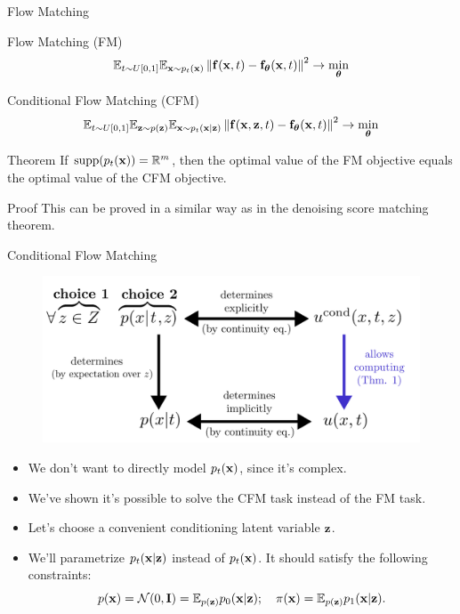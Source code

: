 \documentclass{beamer}
\begin{document}
\begin{frame}{Flow Matching}
	\begin{block}{Flow Matching (FM)}
		\vspace{-0.3cm}
		\[
			\mathbb{E}_{t \sim U[0, 1]} \mathbb{E}_{\mathbf{x} \sim p_t(\mathbf{x})}\left\| \mathbf{f}(\mathbf{x}, t) - \mathbf{f}_{\boldsymbol{\theta}}(\mathbf{x}, t) \right\|^2 \rightarrow \min_{\boldsymbol{\theta}}
		\]
		\vspace{-0.3cm}
	\end{block}
	\begin{block}{Conditional Flow Matching (CFM)}
		\vspace{-0.3cm}
		\[
			\mathbb{E}_{t \sim U[0, 1]} \mathbb{E}_{\mathbf{z} \sim p(\mathbf{z})} \mathbb{E}_{\mathbf{x} \sim p_t(\mathbf{x} | \mathbf{z})}\left\| \mathbf{f}(\mathbf{x}, \mathbf{z}, t) - \mathbf{f}_{\boldsymbol{\theta}}(\mathbf{x}, t) \right\|^2 \rightarrow \min_{\boldsymbol{\theta}}
		\]
		\vspace{-0.3cm}
	\end{block}
	\begin{block}{Theorem}
		If $\text{supp}(p_t(\mathbf{x})) = \mathbb{R}^m$, then the optimal value of the FM objective equals the optimal value of the CFM objective.
	\end{block}
	\begin{block}{Proof}
		This can be proved in a similar way as in the denoising score matching theorem.
	\end{block}
\end{frame}
\begin{frame}{Conditional Flow Matching}
	\begin{figure}
		\centering
		\includegraphics[width=0.75\linewidth]{figs/cfm_uncond_to_cond}
	\end{figure}
	\begin{itemize}
		\item We don't want to directly model $p_t(\mathbf{x})$, since it's complex.
		\item We've shown it's possible to solve the CFM task instead of the FM task.
		\item Let's choose a convenient conditioning latent variable $\mathbf{z}$.
		\item We'll parametrize $p_t(\mathbf{x} | \mathbf{z})$ instead of $p_t(\mathbf{x})$. It should satisfy the following constraints:
		\[
			p(\mathbf{x}) = \mathcal{N}(0, \mathbf{I}) = \mathbb{E}_{p(\mathbf{z})} p_0(\mathbf{x} | \mathbf{z}); \quad \pi(\mathbf{x}) = \mathbb{E}_{p(\mathbf{z})} p_1(\mathbf{x} | \mathbf{z}).
		\]
	\end{itemize}
\end{frame}
\end{document}

